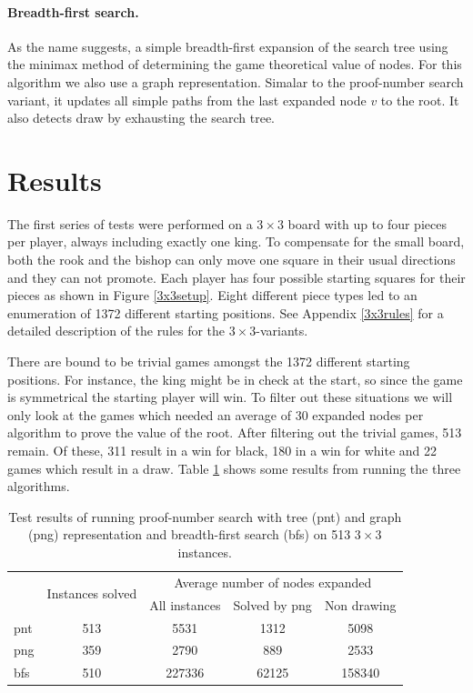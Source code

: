 \documentclass{article}
\begin{document}
\paragraph{Breadth-first search.} As the name suggests, a simple breadth-first expansion of the search tree using the minimax method of determining
the game theoretical value of nodes. For this algorithm we also use a graph representation. Simalar to the proof-number search variant, it
updates all simple paths from the last expanded node $v$ to the root. It also detects draw by exhausting the search tree.

\section{Results}
\label{sec:results}
The first series of tests were performed on a $3 \times 3$ board with up to four pieces per player, always including exactly one king. To compensate
for the small board, both the rook and the bishop can only move one square in their usual directions and they can not promote. Each player
has four possible starting squares for their pieces as shown in Figure \ref{3x3setup}.
Eight different piece types led to an enumeration of 1372 different starting positions.
See Appendix \ref{3x3rules} for a detailed description of the rules for the $3 \times 3$-variants.

There are bound to be trivial games amongst the 1372 different starting positions. For instance, the king might be in check at the start, so since
the game is symmetrical the starting player will win. To filter out these situations we will only look at the games which needed an
average of 30 expanded nodes per algorithm to prove the value of the root. After filtering out the trivial games, 513 remain. Of these, 311 result
in a win for black, 180 in a win for white and 22 games which result in a draw. Table \ref{table:3x3result} shows some results from running the three
algorithms.

\begin{table}[h]
\begin{tabular}{| l | c | c | c | c |}
\cline{2-5}
 \multicolumn{1}{c|}{} & \multirow{2}{*}{Instances solved} & \multicolumn{3}{c|}{Average number of nodes expanded}\\
 \multicolumn{1}{c|}{} &    & \multicolumn{1}{c}{All instances} & \multicolumn{1}{c}{Solved by png} & \multicolumn{1}{c|}{Non drawing} \\ \hline
pnt & 513 & 5531 & 1312 & 5098\\
png & 359 & 2790 & 889 & 2533\\
bfs & 510 & 227336 & 62125 & 158340\\
\hline
\end{tabular}
\label{table:3x3result}
\caption{Test results of running proof-number search with tree (pnt) and graph (png) representation and breadth-first search (bfs) on 513 $3 \times 3$
instances.}
\end{table}
\end{document}
